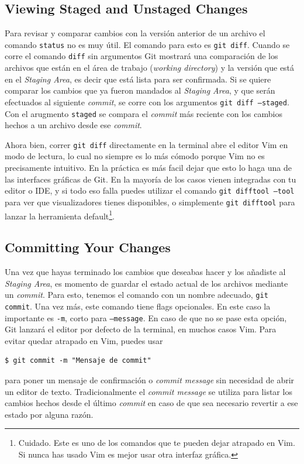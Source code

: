 \documentclass[spanish, 12pt, a4paper]{article}
\begin{document}
\subsection{Viewing Staged and Unstaged Changes}
Para revisar y comparar cambios con la versión anterior de un archivo el comando \texttt{status} no es muy útil.
El comando para esto es \texttt{git diff}.
Cuando se corre el comando \texttt{diff} sin argumentos Git mostrará una comparación de los archivos que están en el área de trabajo (\textit{working directory}) y la versión que está en el \textit{Staging Area}, es decir que está lista para ser confirmada.
Si se quiere comparar los cambios que ya fueron mandados al \textit{Staging Area}, y que serán efectuados al siguiente \textit{commit}, se corre con los argumentos \texttt{git diff --staged}.
Con el arugmento \texttt{staged} se compara el \textit{commit} más reciente con los cambios hechos a un archivo desde ese \textit{commit}.

Ahora bien, correr \texttt{git diff} directamente en la terminal abre el editor Vim en modo de lectura, lo cual no siempre es lo más cómodo porque Vim no es precisamente intuitivo.
En la práctica es más facil dejar que esto lo haga una de las interfaces gráficas de Git.
En la mayoría de los casos vienen integradas con tu editor o IDE, y si todo eso falla puedes utilizar el comando \texttt{git difftool --tool} para ver que visualizadores tienes disponibles, o simplemente \texttt{git difftool} para lanzar la herramienta default\footnote{Cuidado. Este es uno de los comandos que te pueden dejar atrapado en Vim. Si nunca has usado Vim es mejor usar otra interfaz gráfica.}.

\subsection{Committing Your Changes}
Una vez que hayas terminado los cambios que deseabas hacer y los añadiste al \textit{Staging Area}, es momento de guardar el estado actual de los archivos mediante un \textit{commit}.
Para esto, tenemos el comando con un nombre adecuado, \texttt{git commit}.
Una vez más, este comando tiene flags opcionales.
En este caso la importante es \texttt{-m}, corto para \texttt{--message}.
En caso de que no se pase esta opción, Git lanzará el editor por defecto de la terminal, en muchos casos Vim.
Para evitar quedar atrapado en Vim, puedes usar
\begin{lstlisting}
$ git commit -m "Mensaje de commit"
\end{lstlisting}
para poner un mensaje de confirmación o \textit{commit message} sin necesidad de abrir un editor de texto.
Tradicionalmente el \textit{commit message} se utiliza para listar los cambios hechos desde el último \textit{commit} en caso de que sea necesario revertir a ese estado por alguna razón.
\end{document}
